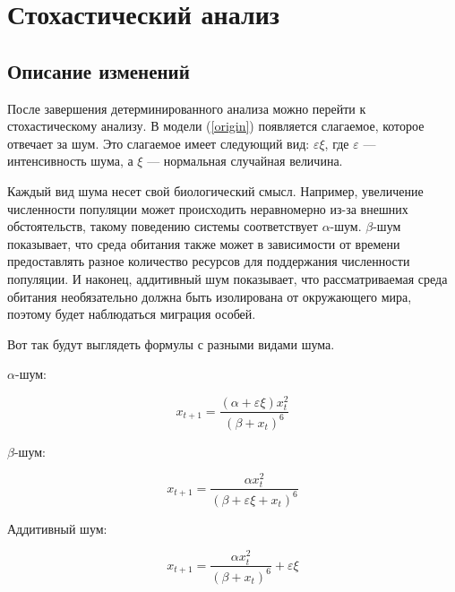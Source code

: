 \section{Стохастический анализ}

    \subsection{Описание изменений}

        После завершения детерминированного анализа можно перейти к стохастическому анализу. В модели (\ref{origin}) появляется слагаемое, которое отвечает за шум. Это слагаемое имеет следующий вид: \(\varepsilon \xi\), где \(\varepsilon\) --- интенсивность шума, а \(\xi\) --- нормальная случайная величина.

        Каждый вид шума несет свой биологический смысл. Например, увеличение численности популяции может происходить неравномерно из-за внешних обстоятельств, такому поведению системы соответствует \(\alpha\)-шум. \(\beta\)-шум показывает, что среда обитания также может в зависимости от времени предоставлять разное количество ресурсов для поддержания численности популяции. И наконец, аддитивный шум показывает, что рассматриваемая среда обитания необязательно должна быть изолирована от окружающего мира, поэтому будет наблюдаться миграция особей.


        Вот так будут выглядеть формулы с разными видами шума.

        \(\alpha\)-шум: 

        \begin{equation}
            \label{alpha_chaos}
            x_{t + 1} = \frac{(\alpha + \varepsilon \xi) x_t^2}{(\beta + x_t)^6}
        \end{equation}

        \(\beta\)-шум:

        \begin{equation}
            \label{beta_chaos}
            x_{t + 1} = \frac{\alpha x_t^2}{(\beta + \varepsilon \xi + x_t)^6}
        \end{equation}

        Аддитивный шум:

        \begin{equation}
            \label{additive_chaos}
            x_{t + 1} = \frac{\alpha x_t^2}{(\beta + x_t)^6} + \varepsilon \xi
        \end{equation}

